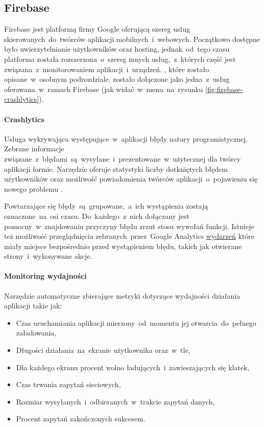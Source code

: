 \subsection{Firebase}
\label{sec:firebase}
Firebase jest platformą firmy Google oferującą szereg usług skierowanych~do~twórców aplikacji mobilnych~i~webowych. Początkowo dostępne było uwierzytelnianie użytkowników oraz hosting, jednak~od~tego czasu platforma została rozszerzona~o~szereg innych usług,~z~których część jest związana~z~monitorowaniem aplikacji~i~urządzeń. , które zostało opisane~w~osobnym podrozdziale, zostało dołączone jako jedna~z~usług oferowana~w~ramach Firebase (jak widać~w~menu~na~rysunku \ref{fig:firebase-crashlytics}).

\bigskip
{}

\paragraph{Crashlytics}
Usługa wykrywająca występujące~w~aplikacji błędy natury programistycznej. Zebrane informacje związane~z~błędami~są~wysyłane~i~prezentowane~w~użytecznej dla twórcy aplikacji formie. Narzędzie oferuje statystyki liczby dotkniętych błędem użytkowników oraz możliwość powiadomienia twórców aplikacji~o~pojawieniu się nowego problemu \cite{Fb_Crashlytics}.

Powtarzające się błędy~są~grupowane,~a~ich wystąpienia zostają oznaczone~na~osi czasu. Do~każdego~z~nich dołączany jest pomocny~w~znajdowaniu przyczyny błędu zrzut stosu wywołań funkcji. Istnieje też możliwość przeglądnięcia zebranych~przez~Google Analytics \hyperref[par:ga-events]{wydarzeń} które miały miejsce bezpośrednio przed wystąpieniem błędu, takich jak otwierane strony~i~wykonywane akcje. 

\paragraph{Monitoring wydajności}
Narzędzie automatyczne zbierające metryki dotyczące wydajności działania aplikacji takie jak:
\begin{itemize}
	\item Czas uruchamiania aplikacji mierzony~od~momentu jej otwarcia~do~pełnego załadowania,
	\item Długości działania~na~ekranie użytkownika oraz~w~tle,
	\item Dla każdego ekranu procent wolno ładujących~i~zawieszających się klatek,
	\item Czas trwania zapytań sieciowych,
	\item Rozmiar wysyłanych~i~odbieranych~w~trakcie zapytań danych,
	\item Procent zapytań zakończonych sukcesem.
\end{itemize}
\bigskip

